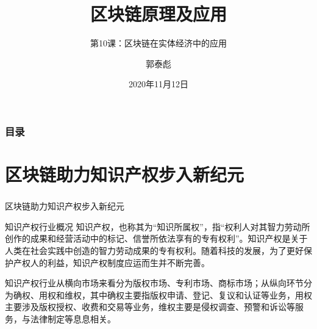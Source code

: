 \documentclass[11pt]{beamer}
\author{郭泰彪}
\title{区块链原理及应用}
\subtitle{第10课：区块链在实体经济中的应用}
\institute[湖工商大数据研究院]{湖南工商大学大数据与互联网创新研究院}
\date{2020年11月12日}
\begin{document}
\begin{frame}
	\maketitle
\end{frame}

\begin{frame}
	\frametitle{目录}
	\tableofcontents[sectionstyle=show,subsectionstyle=show/shaded]
\end{frame}

\section{区块链助力知识产权步入新纪元}

\begin{frame}
	\frametitle{}
	{\Large 	区块链助力知识产权步入新纪元}
\end{frame}


\begin{frame}{知识产权行业概况}
	知识产权，也称其为“知识所属权”，指“权利人对其智力劳动所创作的成果和经营活动中的标记、信誉所依法享有的专有权利”。知识产权是关于人类在社会实践中创造的智力劳动成果的专有权利。随着科技的发展，为了更好保护产权人的利益，知识产权制度应运而生并不断完善。

	知识产权行业从横向市场来看分为版权市场、专利市场、商标市场；从纵向环节分为确权、用权和维权，其中确权主要指版权申请、登记、复议和认证等业务，用权主要涉及版权授权、收费和交易等业务，维权主要是侵权调查、预警和诉讼等服务，与法律制定等息息相关。
\end{frame}
\end{document}
